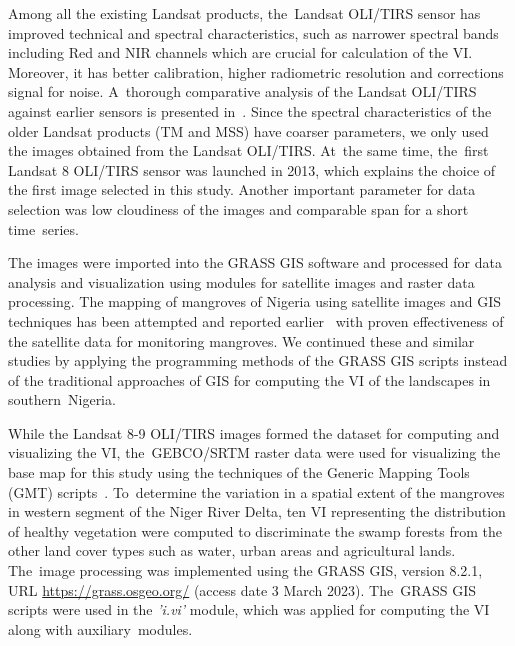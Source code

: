 \documentclass[jmse,article,accept,pdftex,moreauthors]{Definitions/mdpi}
\begin{document}
Among all the existing Landsat products, the~Landsat OLI/TIRS sensor has improved technical and spectral characteristics, such as narrower spectral bands including Red and NIR channels which are crucial for calculation of the VI. Moreover, it has better calibration, higher radiometric resolution and corrections signal for noise. A~thorough comparative analysis of the Landsat OLI/TIRS against earlier sensors is presented in~\cite{ROY201657}. Since the spectral characteristics of the older Landsat products (TM and MSS) have coarser parameters, we only used the images obtained from the Landsat OLI/TIRS. At~the same time, the~first Landsat 8 OLI/TIRS sensor was launched in 2013, which explains the choice of the first image selected in this study. Another important parameter for data selection was low cloudiness of the images and comparable span for a short time~series. 

The images were imported into the GRASS GIS software and processed for data analysis and visualization using modules for satellite images and raster data processing. The mapping of mangroves of Nigeria using satellite images and GIS techniques has been attempted and reported earlier~\cite{Ozigis,GUNDLACH2022100831,Sobande,ijerph2006030011} with proven effectiveness of the satellite data for monitoring mangroves. We continued these and similar studies by applying the programming methods of the GRASS GIS scripts instead of the traditional approaches of GIS for computing the VI of the landscapes in southern~Nigeria. 

While the Landsat 8-9 OLI/TIRS images formed the dataset for computing and visualizing the VI, the~GEBCO/SRTM raster data were used for visualizing the base map for this study using the techniques of the Generic Mapping Tools (GMT) scripts~\cite{Lemenkova202228,Lemenkova202301}. To~determine the variation in a spatial extent of the mangroves in western segment of the Niger River Delta, ten VI representing the distribution of healthy vegetation were computed to discriminate the swamp forests from the other land cover types such as water, urban areas and agricultural lands. The~image processing was implemented using the GRASS GIS, version 8.2.1, URL \href{https://grass.osgeo.org/}{https://grass.osgeo.org/} (access date 3 March 2023). The~GRASS GIS scripts were used in the \emph{'i.vi'} module, which was applied for computing the VI along with auxiliary~modules. 
\end{document}
